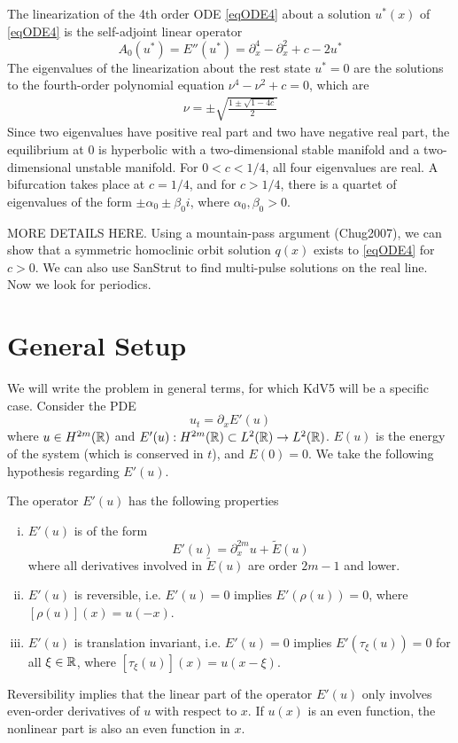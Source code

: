 \documentclass[thesis.tex]{subfiles}
\begin{document}
The linearization of the 4th order ODE \eqref{eqODE4} about a solution $u^*(x)$ of \eqref{eqODE4} is the self-adjoint linear operator
\begin{equation}\label{defA0}
A_0(u^*) = E''(u^*) = \partial_x^4 - \partial_x^2 + c - 2 u^* 
\end{equation}
The eigenvalues of the linearization about the rest state $u^* = 0$ are the solutions to the fourth-order polynomial equation $\nu^4 - \nu^2 + c = 0$, which are
\begin{align}\label{specA0}
\nu = \pm \sqrt{ \frac{1 \pm \sqrt{1 - 4c} }{2}}
\end{align}
Since two eigenvalues have positive real part and two have negative real part, the equilibrium at 0 is hyperbolic with a two-dimensional stable manifold and a two-dimensional unstable manifold. For $0 < c < 1/4$, all four eigenvalues are real. A bifurcation takes place at $c = 1/4$, and for $c > 1/4$, there is a quartet of eigenvalues of the form $\pm \alpha_0 \pm \beta_0 i$, where $\alpha_0, \beta_0 > 0$.

MORE DETAILS HERE. Using a mountain-pass argument (Chug2007), we can show that a symmetric homoclinic orbit solution $q(x)$ exists to \eqref{eqODE4} for $c > 0$. We can also use SanStrut to find multi-pulse solutions on the real line. Now we look for periodics. 

\section{General Setup}

We will write the problem in general terms, for which KdV5 will be a specific case. Consider the PDE
\begin{equation}\label{genPDE}
u_t = \partial_x E'(u)
\end{equation}
where $u \in H^{2m}({\mathbb R})$ and $E'(u): H^{2m}({\mathbb R}) \subset L^2({\mathbb R}) \rightarrow L^2({\mathbb R})$. $E(u)$ is the energy of the system (which is conserved in $t$), and $E(0) = 0$. We take the following hypothesis regarding $E'(u)$.

\begin{hypothesis}\label{Eprimehyp}
The operator $E'(u)$ has the following properties
\begin{enumerate}[(i)]
\item $E'(u)$ is of the form
\begin{equation}\label{Eprimeuform}
E'(u) = \partial_x^{2m}u + \tilde{E}(u)
\end{equation}
where all derivatives involved in $\tilde{E}(u)$ are order $2m-1$ and lower.
\item $E'(u)$ is reversible, i.e. $E'(u) = 0$ implies $E'(\rho(u)) = 0$,
where $[\rho(u)](x) = u(-x)$.
\item $E'(u)$ is translation invariant, i.e. $E'(u) = 0$ implies $E'(\tau_\xi(u)) = 0$ for all $\xi \in {\mathbb R}$, where $[\tau_\xi(u)](x) = u(x - \xi)$.
\end{enumerate}
\end{hypothesis}
Reversibility implies that the linear part of the operator $E'(u)$ only involves even-order derivatives of $u$ with respect to $x$. If $u(x)$ is an even function, the nonlinear part is also an even function in $x$.
\end{document}
